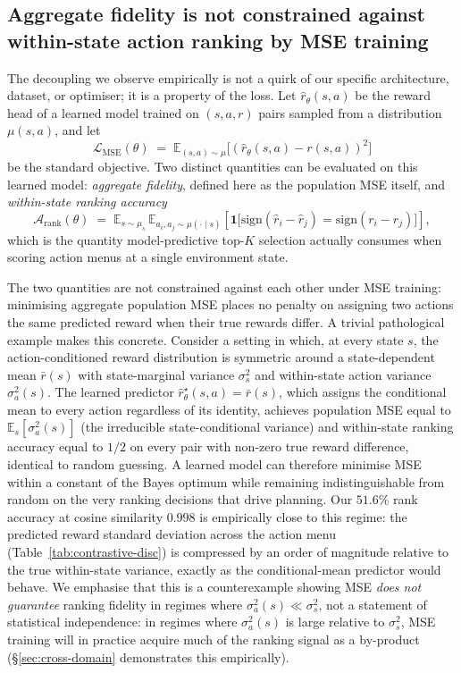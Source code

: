 \documentclass[11pt]{article}
\begin{document}
\subsection*{Aggregate fidelity is not constrained against within-state action ranking by MSE training}\label{sec:fidelity-vs-ranking}

The decoupling we observe empirically is not a quirk of our specific architecture, dataset, or optimiser; it is a property of the loss. Let $\hat{r}_\theta(s, a)$ be the reward head of a learned model trained on $(s, a, r)$ pairs sampled from a distribution $\mu(s, a)$, and let
\begin{equation}
\mathcal{L}_{\text{MSE}}(\theta) \;=\; \mathbb{E}_{(s,a)\sim\mu}\big[(\hat{r}_\theta(s,a) - r(s,a))^2\big]
\end{equation}
be the standard objective. Two distinct quantities can be evaluated on this learned model: \emph{aggregate fidelity}, defined here as the population MSE itself, and \emph{within-state ranking accuracy}
\begin{equation}
\mathcal{A}_{\text{rank}}(\theta) \;=\; \mathbb{E}_{s\sim\mu_s}\,\mathbb{E}_{a_i,a_j\sim\mu(\cdot \mid s)}\!\left[\mathbf{1}\big[\mathrm{sign}(\hat{r}_i - \hat{r}_j) = \mathrm{sign}(r_i - r_j)\big]\right],
\end{equation}
which is the quantity model-predictive top-$K$ selection actually consumes when scoring action menus at a single environment state.

The two quantities are not constrained against each other under MSE training: minimising aggregate population MSE places no penalty on assigning two actions the same predicted reward when their true rewards differ. A trivial pathological example makes this concrete. Consider a setting in which, at every state $s$, the action-conditioned reward distribution is symmetric around a state-dependent mean $\bar{r}(s)$ with state-marginal variance $\sigma_s^2$ and within-state action variance $\sigma_a^2(s)$. The learned predictor $\hat{r}_\theta^{\star}(s,a) = \bar{r}(s)$, which assigns the conditional mean to every action regardless of its identity, achieves population MSE equal to $\mathbb{E}_s[\sigma_a^2(s)]$ (the irreducible state-conditional variance) and within-state ranking accuracy equal to $1/2$ on every pair with non-zero true reward difference, identical to random guessing. A learned model can therefore minimise MSE within a constant of the Bayes optimum while remaining indistinguishable from random on the very ranking decisions that drive planning. Our $51.6\%$ rank accuracy at cosine similarity $0.998$ is empirically close to this regime: the predicted reward standard deviation across the action menu (Table~\ref{tab:contrastive-disc}) is compressed by an order of magnitude relative to the true within-state variance, exactly as the conditional-mean predictor would behave. We emphasise that this is a counterexample showing MSE \emph{does not guarantee} ranking fidelity in regimes where $\sigma_a^2(s) \ll \sigma_s^2$, not a statement of statistical independence: in regimes where $\sigma_a^2(s)$ is large relative to $\sigma_s^2$, MSE training will in practice acquire much of the ranking signal as a by-product (\S\ref{sec:cross-domain} demonstrates this empirically).
\end{document}

